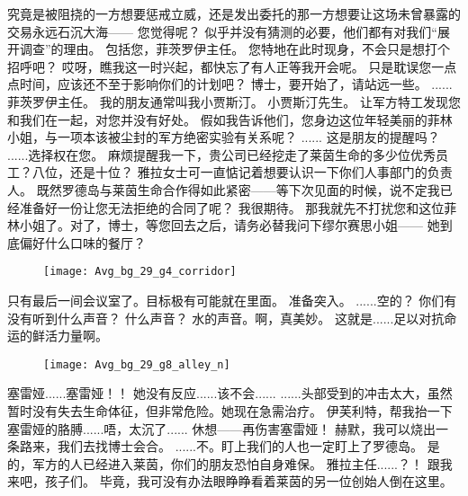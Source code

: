 \documentclass[openany]{book}
\begin{document}
\begin{dialogue}
     究竟是被阻挠的一方想要惩戒立威，还是发出委托的那一方想要让这场未曾暴露的交易永远石沉大海——
     您觉得呢？
     似乎并没有猜测的必要，他们都有对我们“展开调查”的理由。
     包括您，菲茨罗伊主任。
     您特地在此时现身，不会只是想打个招呼吧？
     哎呀，瞧我这一时兴起，都快忘了有人正等我开会呢。
     只是耽误您一点点时间，应该还不至于影响你们的计划吧？
     博士，要开始了，请站远一些。
     ......菲茨罗伊主任。
     我的朋友通常叫我小贾斯汀。
     小贾斯汀先生。
     让军方特工发现您和我们在一起，对您并没有好处。
     假如我告诉他们，您身边这位年轻美丽的菲林小姐，与一项本该被尘封的军方绝密实验有关系呢？
     ......
     这是朋友的提醒吗？
     ......选择权在您。
     麻烦提醒我一下，贵公司已经挖走了莱茵生命的多少位优秀员工？八位，还是十位？
     雅拉女士可一直惦记着想要认识一下你们人事部门的负责人。
     既然罗德岛与莱茵生命合作得如此紧密——等下次见面的时候，说不定我已经准备好一份让您无法拒绝的合同了呢？
     我很期待。
     那我就先不打扰您和这位菲林小姐了。对了，博士，等您回去之后，请务必替我问下缪尔赛思小姐——
     她到底偏好什么口味的餐厅？
    \begin{figure}[h]
        \centering
        \texttt{[image: Avg\_bg\_29\_g4\_corridor]}
    \end{figure}
     只有最后一间会议室了。目标极有可能就在里面。
     准备突入。
     ......空的？
     你们有没有听到什么声音？
     什么声音？
     水的声音。啊，真美妙。
     这就是......足以对抗命运的鲜活力量啊。
\end{dialogue}

\begin{figure}[h]
    \centering
    \texttt{[image: Avg\_bg\_29\_g8\_alley\_n]}
\end{figure}
\begin{dialogue}
     塞雷娅......塞雷娅！！
     她没有反应......该不会......
     ......头部受到的冲击太大，虽然暂时没有失去生命体征，但非常危险。她现在急需治疗。
     伊芙利特，帮我抬一下塞雷娅的胳膊......唔，太沉了......
     休想——再伤害塞雷娅！
     赫默，我可以烧出一条路来，我们去找博士会合。
     ......不。盯上我们的人也一定盯上了罗德岛。
     是的，军方的人已经进入莱茵，你们的朋友恐怕自身难保。
     雅拉主任......？！
     跟我来吧，孩子们。
     毕竟，我可没有办法眼睁睁看着莱茵的另一位创始人倒在这里。
\end{dialogue}
\end{document}
